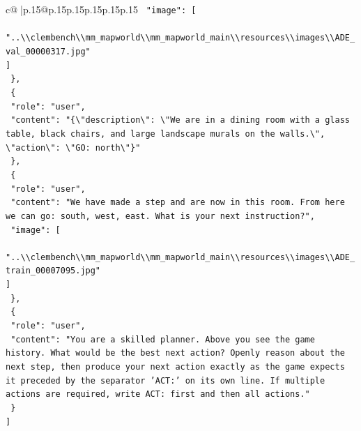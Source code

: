 \documentclass{article}
\begin{document}
{\begin{supertabular}{c@{$\;$}|p{.15\linewidth}@{}p{.15\linewidth}p{.15\linewidth}p{.15\linewidth}p{.15\linewidth}p{.15\linewidth}}
{{{\texttt{    "image": {[}} \\
\texttt{      "..\textbackslash{}\textbackslash{}clembench\textbackslash{}\textbackslash{}mm\_mapworld\textbackslash{}\textbackslash{}mm\_mapworld\_main\textbackslash{}\textbackslash{}resources\textbackslash{}\textbackslash{}images\textbackslash{}\textbackslash{}ADE\_val\_00000317.jpg"} \\
\texttt{    {]}} \\
\texttt{  \},} \\
\texttt{  \{} \\
\texttt{    "role": "user",} \\
\texttt{    "content": "\{\textbackslash{}"description\textbackslash{}": \textbackslash{}"We are in a dining room with a glass table, black chairs, and large landscape murals on the walls.\textbackslash{}", \textbackslash{}"action\textbackslash{}": \textbackslash{}"GO: north\textbackslash{}"\}"} \\
\texttt{  \},} \\
\texttt{  \{} \\
\texttt{    "role": "user",} \\
\texttt{    "content": "We have made a step and are now in this room. From here we can go: south, west, east. What is your next instruction?",} \\
\texttt{    "image": {[}} \\
\texttt{      "..\textbackslash{}\textbackslash{}clembench\textbackslash{}\textbackslash{}mm\_mapworld\textbackslash{}\textbackslash{}mm\_mapworld\_main\textbackslash{}\textbackslash{}resources\textbackslash{}\textbackslash{}images\textbackslash{}\textbackslash{}ADE\_train\_00007095.jpg"} \\
\texttt{    {]}} \\
\texttt{  \},} \\
\texttt{  \{} \\
\texttt{    "role": "user",} \\
\texttt{    "content": "You are a skilled planner. Above you see the game history. What would be the best next action? Openly reason about the next step, then produce your next action exactly as the game expects it preceded by the separator 'ACT:' on its own line. If multiple actions are required, write ACT: first and then all actions."} \\
\texttt{  \}} \\
\texttt{{]}} \\
            }
        }
    }
     \\ \\


\end{supertabular}}
\end{document}
